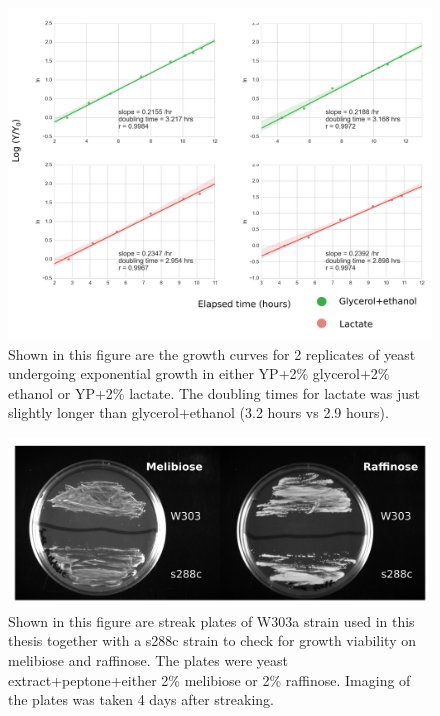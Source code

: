 \begin{figure}[htp]
		\centering
	    \includegraphics[width=\textwidth]{grwthcvs}
	    \caption{Shown in this figure are the growth curves for 2 replicates of yeast undergoing exponential growth in either YP+2\% glycerol+2\% ethanol or YP+2\% lactate. The doubling times for lactate was just slightly longer than glycerol+ethanol (3.2 hours vs 2.9 hours).}\label{fig:grwtcvs}
\end{figure}
%
%
\begin{figure}[htp]
		\centering
	    \includegraphics[width=\textwidth]{meli}
	    \caption{Shown in this figure are streak plates of W303a strain used in this thesis together with a s288c strain to check for growth viability on melibiose and raffinose. The plates were yeast extract+peptone+either 2\% melibiose or 2\% raffinose. Imaging of the plates was taken 4 days after streaking.}\label{fig:meli}
\end{figure}
%
%	    
